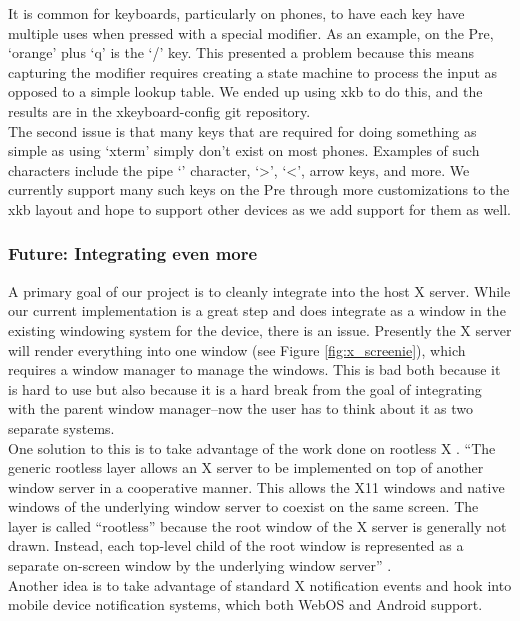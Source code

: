 It is common for keyboards, particularly on phones, to have each key have multiple uses when pressed with a special modifier.  As an example, on the Pre, `orange' plus `q' is the `/' key.  This presented a problem because this means capturing the modifier requires creating a state machine to process the input as opposed to a simple lookup table.  We ended up using xkb to do this, and the results are in the xkeyboard-config git repository. \\

The second issue is that many keys that are required for doing something as simple as using `xterm' simply don't exist on most phones.  Examples of such characters include the pipe `\textbar' character, `\textgreater', `\textless', arrow keys, and more.  We currently support many such keys on the Pre through more customizations to the xkb layout and hope to support other devices as we add support for them as well.
\subsubsection{Future: Integrating even more}
A primary goal of our project is to cleanly integrate into the host X server.  While our current implementation is a great step and does integrate as a window in the existing windowing system for the device, there is an issue.  Presently the X server will render everything into one window (see Figure \ref{fig:x_screenie}), which requires a window manager to manage the windows.  This is bad both because it is hard to use but also because it is a hard break from the goal of integrating with the parent window manager--now the user has to think about it as two separate systems.\\

One solution to this is to take advantage of the work done on rootless X \cite{rootless}.  ``The generic rootless layer allows an X server to be implemented on top of another window server in a cooperative manner. This allows the X11 windows and native windows of the underlying window server to coexist on the same screen. The layer is called ``rootless'' because the root window of the X server is generally not drawn. Instead, each top-level child of the root window is represented as a separate on-screen window by the underlying window server'' \cite{rootless}.\\

Another idea is to take advantage of standard X notification events \cite{notifications} and hook into mobile device notification systems, which both WebOS and Android support. 

